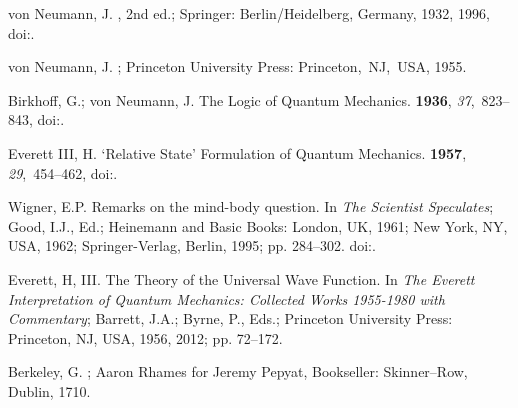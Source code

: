 
%


\begin{thebibliography}{999}
\providecommand{\natexlab}[1]{#1}

{von Neumann}, J.
, 2nd ed.;
 Springer: Berlin/Heidelberg, Germany,  1932, 1996,
 doi:{\href{https://doi.org/10.1007/978-3-642-61409-5}{}}. %

{von Neumann}, J.
; Princeton
 University Press: Princeton,~NJ,~USA, 1955.

Birkhoff, G.; {von Neumann}, J.
\newblock The Logic of Quantum Mechanics.
 {\bf 1936}, {\em 37},~823--843,
\newblock
 doi:{\href{https://doi.org/10.2307/1968621}{}}.

{Everett III}, H.
\newblock `{R}elative {S}tate' Formulation of Quantum Mechanics.
 {\bf 1957}, {\em 29},~454--462,
\newblock
 doi:{\href{https://doi.org/10.1103/RevModPhys.29.454}{}}.

Wigner, E.P.
\newblock Remarks on the mind-body question. In {\em The Scientist Speculates};
 Good, I.J., Ed.; Heinemann and Basic Books: London, UK, 1961; New York, NY, USA, 1962; Springer-Verlag, Berlin, 1995;
 pp. 284--302.
\newblock
 doi:{\href{https://doi.org/10.1007/978-3-642-78374-6\_20}{}}.

{Everett}, H, III.
\newblock The Theory of the Universal Wave Function. In {\em The {E}verett
 Interpretation of Quantum Mechanics: Collected Works 1955-1980 with
 Commentary}; Barrett, J.A.; Byrne, P., Eds.; Princeton University Press:
 Princeton, NJ, USA, 1956, 2012; pp. 72--172.

Berkeley, G.
; Aaron Rhames for Jeremy Pepyat, Bookseller: Skinner--Row, Dublin, 1710.


\end{thebibliography}

